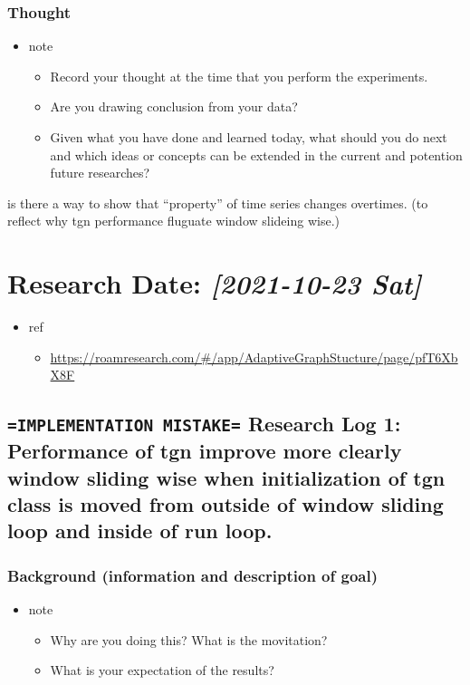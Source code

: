 \documentclass[11pt]{article}
\begin{document}
\subsubsection{Thought}
\label{sec:org95f124e}
\begin{itemize}
\item note
\begin{itemize}
\item Record your thought at the time that you perform the experiments.
\item Are you drawing conclusion from your data?
\item Given what you have done and learned today, what should you do next and which ideas or concepts can be extended in the current and potention future researches?
\end{itemize}
\end{itemize}
is there a way to show that ``property'' of time series changes overtimes. (to reflect why tgn performance fluguate window slideing wise.)
\section{Research Date: \textit{[2021-10-23 Sat]}}
\label{sec:org3066912}
\begin{itemize}
\item ref
\begin{itemize}
\item \url{https://roamresearch.com/\#/app/AdaptiveGraphStucture/page/pfT6XbX8F}
\end{itemize}
\end{itemize}
\subsection{\texttt{=IMPLEMENTATION MISTAKE=} Research Log 1: Performance of tgn improve more clearly window sliding wise when initialization of tgn class is moved from outside of window sliding loop and inside of run loop.}
\label{sec:org025244e}
\subsubsection{Background (information and description of goal)}
\label{sec:orgb071061}
\begin{itemize}
\item note
\begin{itemize}
\item Why are you doing this? What is the movitation?
\item What is your expectation of the results?
\end{itemize}
\end{itemize}
\end{document}
